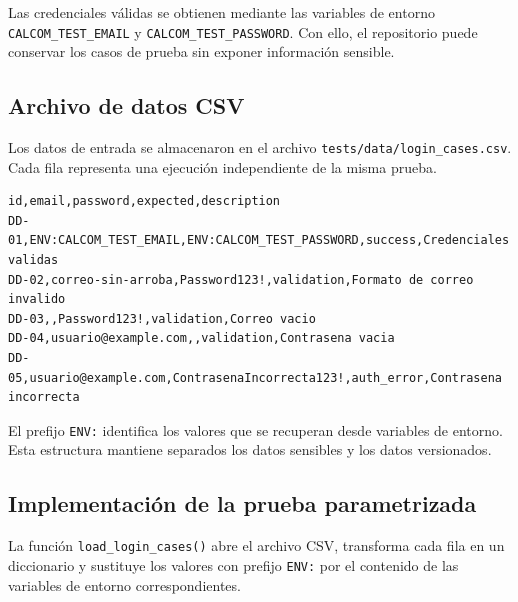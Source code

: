 \documentclass[12pt,letterpaper]{article}
\begin{document}
Las credenciales válidas se obtienen mediante las variables de entorno \texttt{CALCOM\_TEST\_EMAIL} y \texttt{CALCOM\_TEST\_PASSWORD}. Con ello, el repositorio puede conservar los casos de prueba sin exponer información sensible.

\subsection{Archivo de datos CSV}

Los datos de entrada se almacenaron en el archivo \texttt{tests/data/login\_cases.csv}. Cada fila representa una ejecución independiente de la misma prueba.

\begin{lstlisting}[caption={Archivo CSV con los casos de prueba data-driven}]
id,email,password,expected,description
DD-01,ENV:CALCOM_TEST_EMAIL,ENV:CALCOM_TEST_PASSWORD,success,Credenciales validas
DD-02,correo-sin-arroba,Password123!,validation,Formato de correo invalido
DD-03,,Password123!,validation,Correo vacio
DD-04,usuario@example.com,,validation,Contrasena vacia
DD-05,usuario@example.com,ContrasenaIncorrecta123!,auth_error,Contrasena incorrecta
\end{lstlisting}

El prefijo \texttt{ENV:} identifica los valores que se recuperan desde variables de entorno. Esta estructura mantiene separados los datos sensibles y los datos versionados.

\subsection{Implementación de la prueba parametrizada}

La función \texttt{load\_login\_cases()} abre el archivo CSV, transforma cada fila en un diccionario y sustituye los valores con prefijo \texttt{ENV:} por el contenido de las variables de entorno correspondientes.
\end{document}
